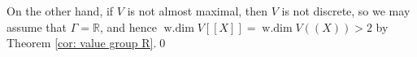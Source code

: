 \documentclass[12pt]{amsart}
\newtheorem{theorem}{Theorem}[section]
\theoremstyle{plain}
\newcommand{\wdim}{\operatorname{w.dim}}
\begin{document}
\noindent On the other hand, if $V$ is not almost maximal, then $V$ is not discrete, so we may assume that $\Gamma=\mathbb{R}$, and hence $\wdim V[[X]]=\wdim V((X))>2$ by Theorem \ref{cor: value group R}.\qed

\end{document}
